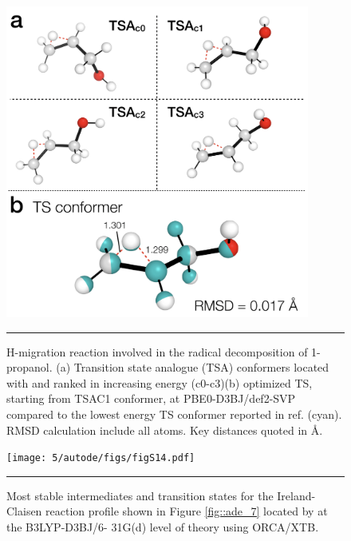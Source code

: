 \documentclass[../../main.tex]{subfiles}
\begin{document}
\begin{figure}[h!]
	\vspace{0.4cm}
	\centering
	\includegraphics[width=10cm]{5/autode/figs/figS13}
	\vspace{0.4cm}
	\hrule
	\caption{H-migration reaction involved in the radical decomposition of 1-propanol. (a) Transition state analogue (TSA) conformers located with \ade and ranked in increasing energy (c0-c3)(b) optimized TS, starting from TSAC1 conformer, at PBE0-D3BJ/def2-SVP compared to the lowest energy TS conformer reported in ref. \cite{Ferro-Costas2018} (cyan). RMSD calculation include all atoms. Key distances quoted in \AA.}
	\label{fig::ade_si_13}
\end{figure}



\begin{figure}[h!]
	\vspace{0.4cm}
	\centering
	\texttt{[image: 5/autode/figs/figS14.pdf]}
	\vspace{0.4cm}
	\hrule
	\caption{Most stable intermediates and transition states for the Ireland-Claisen reaction profile shown in Figure \ref{fig::ade_7} located by \ade at the B3LYP-D3BJ/6- 31G(d) level of theory using ORCA/XTB. }
	\label{fig::ade_si_14}
\end{figure}
\end{document}
